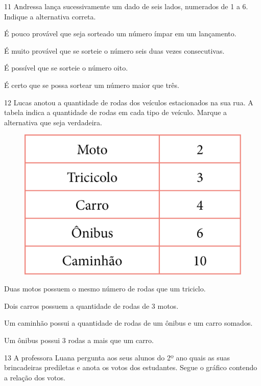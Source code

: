 \pagebreak
\num{11} Andressa lança sucessivamente um dado de seis lados, numerados de 1 a 6.
Indique a alternativa correta.

\begin{escolha}
\item É pouco provável que seja sorteado um número ímpar em um lançamento.

\item É muito provável que se sorteie o número seis duas vezes consecutivas.

\item É possível que se sorteie o número oito.

\item É certo que se possa sortear um número maior que três.
\end{escolha}


\num{12} Lucas anotou a quantidade de rodas dos veículos estacionados na sua rua.
A tabela indica a quantidade de rodas em cada tipo de veículo. Marque a
alternativa que seja verdadeira.

\begin{figure}[htpb!]
\centering
\includegraphics[width=.6\textwidth]{./media/image157.png}
\end{figure}

\begin{escolha}
\item Duas motos possuem o mesmo número de rodas que um triciclo.

\item Dois carros possuem a quantidade de rodas de 3 motos.

\item Um caminhão possui a quantidade de rodas de um ônibus e um carro somados.

\item Um ônibus possui 3 rodas a mais que um carro.
\end{escolha}

\pagebreak
\num{13} A professora Luana pergunta aos seus alunos do 2º ano quais as suas
brincadeiras prediletas e anota os votos dos estudantes. Segue o gráfico
contendo a relação dos votos.

